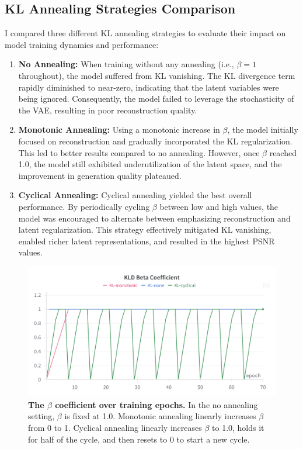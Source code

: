 \documentclass[twocolumn,a4paper]{article}
\begin{document}
\subsection{KL Annealing Strategies Comparison}

I compared three different KL annealing strategies to evaluate their impact on model training dynamics and performance:

\begin{enumerate}
    \item \textbf{No Annealing:} When training without any annealing (i.e., $\beta = 1$ throughout), the model suffered from KL vanishing. The KL divergence term rapidly diminished to near-zero, indicating that the latent variables were being ignored. Consequently, the model failed to leverage the stochasticity of the VAE, resulting in poor reconstruction quality.
    
    \item \textbf{Monotonic Annealing:} Using a monotonic increase in $\beta$, the model initially focused on reconstruction and gradually incorporated the KL regularization. This led to better results compared to no annealing. However, once $\beta$ reached 1.0, the model still exhibited underutilization of the latent space, and the improvement in generation quality plateaued.
    
    \item \textbf{Cyclical Annealing:} Cyclical annealing yielded the best overall performance. By periodically cycling $\beta$ between low and high values, the model was encouraged to alternate between emphasizing reconstruction and latent regularization. This strategy effectively mitigated KL vanishing, enabled richer latent representations, and resulted in the highest PSNR values.
\end{enumerate}

\begin{figure}[H]
\centering
\includegraphics[width=0.95\linewidth]{figures/kl_beta}
\caption{\textbf{The $\beta$ coefficient over training epochs.} In the no annealing setting, $\beta$ is fixed at 1.0. Monotonic annealing linearly increases $\beta$ from 0 to 1. Cyclical annealing linearly increases $\beta$ to 1.0, holds it for half of the cycle, and then resets to 0 to start a new cycle.}
\label{fig:klbeta}
\end{figure}
\end{document}
